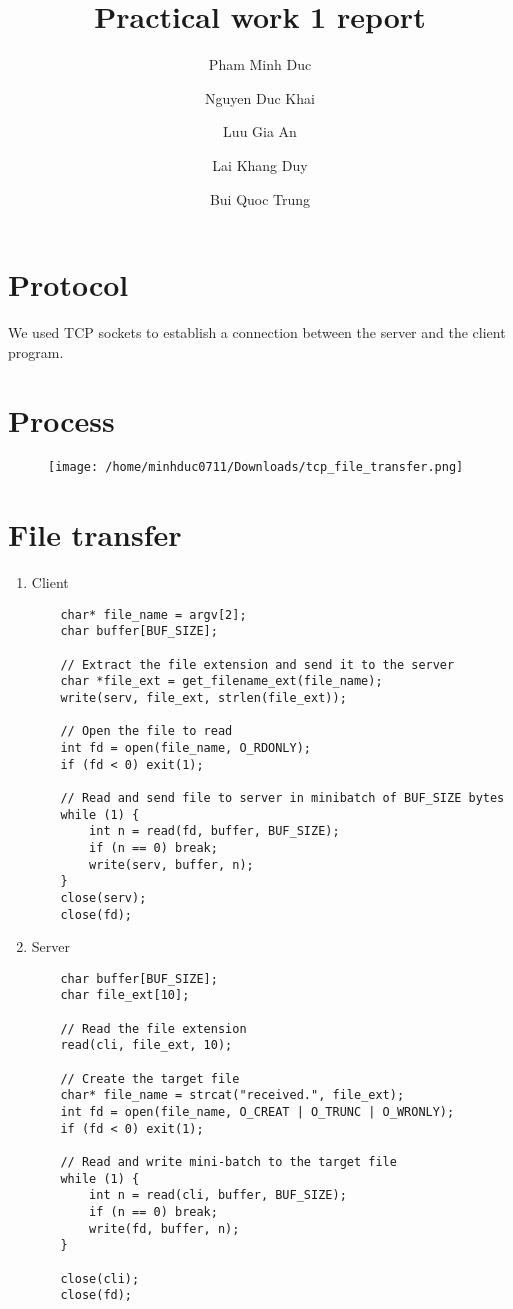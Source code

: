 \documentclass{article}
\title{Practical work 1 report}
\author{Pham Minh Duc \and Nguyen Duc Khai \and Luu Gia An \and Lai Khang Duy \and Bui Quoc Trung}
\begin{document}
\maketitle

\section{Protocol}
We used TCP sockets to establish a connection between the server and the client program.

\section{Process}

\begin{figure}[!htb]
	\centering
	\texttt{[image: /home/minhduc0711/Downloads/tcp\_file\_transfer.png]}
	\caption{}
	\label{TCP file transfer}
\end{figure}


\section{File transfer}

\begin{enumerate}
	\item Client
	\begin{lstlisting}
	char* file_name = argv[2];
	char buffer[BUF_SIZE];
	
	// Extract the file extension and send it to the server
	char *file_ext = get_filename_ext(file_name);
	write(serv, file_ext, strlen(file_ext));
	
	// Open the file to read
	int fd = open(file_name, O_RDONLY);
	if (fd < 0) exit(1);
	
	// Read and send file to server in minibatch of BUF_SIZE bytes
	while (1) {
		int n = read(fd, buffer, BUF_SIZE);
		if (n == 0) break;
		write(serv, buffer, n);
	}
	close(serv);
	close(fd);
	\end{lstlisting}
	
	\item Server
	\begin{lstlisting}
	char buffer[BUF_SIZE];
	char file_ext[10];
	
	// Read the file extension
	read(cli, file_ext, 10);
	
	// Create the target file
	char* file_name = strcat("received.", file_ext);
	int fd = open(file_name, O_CREAT | O_TRUNC | O_WRONLY);
	if (fd < 0) exit(1);
	
	// Read and write mini-batch to the target file
	while (1) {
		int n = read(cli, buffer, BUF_SIZE);
		if (n == 0) break;
		write(fd, buffer, n);
	}
	
	close(cli);
	close(fd);
	\end{lstlisting}
	
\end{enumerate}
\end{document}
